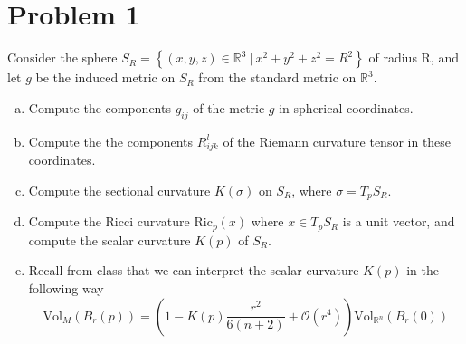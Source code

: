 \documentclass[a4paper]{article}
\begin{document}
\section*{Problem 1}%

Consider the sphere $S_R = \left\{ (x,y,z) \in \mathds{R}^3\ |\ x^2 + y^2 + z^2 = R^2 \right\}$ of radius R, and let $g$ be the induced metric on $S_R$ from the standard metric on $\mathds{R}^3$. 
\begin{enumerate}[(a)]
  \item Compute the components $g_{ij}$ of the metric $g$ in spherical coordinates.
  \item Compute the the components $R_{ijk}^l$ of the Riemann curvature tensor in these coordinates.
  \item Compute the sectional curvature $K(\sigma)$ on $S_R$, where $\sigma = T_pS_R$.
  \item Compute the Ricci curvature $\text{Ric}_p(x)$ where $x \in T_pS_R$ is a unit vector, and compute the scalar curvature $K(p)$ of $S_R$.
  \item Recall from class that we can interpret the scalar curvature $K(p)$ in the following way
    \[
      \text{Vol}_M(B_r(p)) = \left( 1 - K(p) \frac{r^2}{6(n+2)} + \mathcal{O}(r^4) \right)\text{Vol}_{\mathds{R}^n}(B_r(0))
    \]
\end{enumerate}
\end{document}
